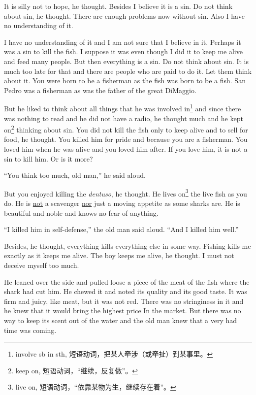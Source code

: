 \documentclass[fontset=ubuntu]{ctexrep}
\begin{document}
It is \gls{silly} not to hope, he thought. Besides I believe it is a
\gls{sin}. Do not think about sin, he thought. There are enough problems now
without sin. Also I have no \gls{understanding} of it.

I have no understanding of it and I am not sure that I believe in it.
Perhaps it was a sin to kill the fish. I suppose it was even though I did it
to keep me alive and feed many people. But then everything is a sin. Do not
think about sin. It is much too late for that and there are people who are
paid to do it. Let them think about it. You were born to be a fisherman as
the fish was born to be a fish. San Pedro was a fisherman as was the father
of the great DiMaggio.

But he liked to think about all things that he was \gls{involved}
in\footnote{involve sb in sth, 短语动词，把某人牵涉（或牵扯）到某事里。} and
since there was nothing to read and he did not have a radio, he thought much
and he kept on\footnote{keep on, 短语动词，“继续，反复做”。} thinking
about sin. You did not kill the fish only to keep alive and to sell for
food, he thought. You killed him for pride and because you are a fisherman.
You loved him when he was alive and you loved him after. If you love him, it
is not a sin to kill him. Or is it more?

``You think too much, old man,'' he said aloud.

But you enjoyed killing the \emph{dentuso}, he thought. He lives on\footnote{live
  on, 短语动词，“依靠某物为生，继续存在着”。} the live fish as you do. He
is \uline{not} a \gls{scavenger} \uline{nor} just a moving \gls{appetite} as some
sharks are. He is beautiful and noble and knows no fear of anything.

``I killed him in self-defense,'' the old man said aloud. ``And I killed him
well.''

Besides, he thought, everything kills everything else in some way. Fishing
kills me exactly as it keeps me alive. The boy keeps me alive, he thought. I
must not \gls{deceive} myself too much.

He leaned over the side and pulled loose a piece of the meat of the fish
where the shark had cut him. He chewed it and noted its \gls{quality} and its
good taste. It was firm and juicy, like meat, but it was not red. There was
no \gls{stringiness} in it and he knew that it would bring the highest price
In the market. But there was no way to keep its scent out of the water and
the old man knew that a very had time was coming.
\end{document}
